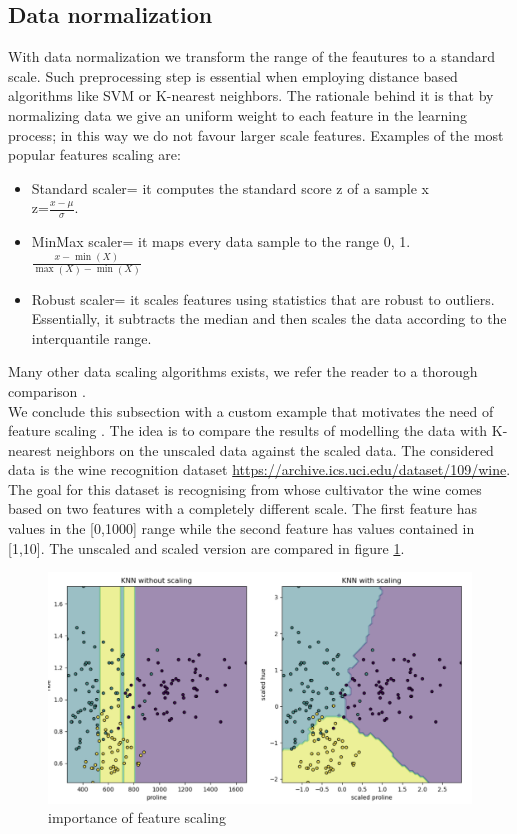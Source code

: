 \subsection{Data normalization}\label{appendix:normalization}
With data normalization we transform the range of the feautures to a standard scale.
Such preprocessing step is essential when employing distance based algorithms like SVM or K-nearest neighbors. The rationale behind it is that by normalizing data we give an uniform weight to each feature in the learning process; in this way we do not favour larger scale features.
Examples of the most popular features scaling are:
\begin{itemize}
    \item Standard scaler= it computes the standard score z of a sample x
    \\
    z=$\frac{x-\mu}{\sigma}$.
    \item MinMax scaler= it maps every data sample to the range 0, 1.
    \\
    $\frac{x-\min(X)}{\max(X)-\min(X)}$
    \item Robust scaler= it scales features using statistics that are robust to outliers.
    Essentially, it subtracts the median and then scales the data according to the interquantile range.
\end{itemize}
Many other data scaling algorithms exists, we refer the reader to a thorough comparison .
\\
We conclude this subsection with a custom example that motivates the need of feature scaling . The idea is to compare the results of modelling the data with K-nearest neighbors on the unscaled data against the scaled data. The considered data is the wine recognition dataset \href{https://archive.ics.uci.edu/dataset/109/wine}{https://archive.ics.uci.edu/dataset/109/wine}. The goal for this dataset is recognising from whose cultivator the wine comes based on two features with a completely different scale. The first feature has values in the [0,1000] range while the second feature has values contained in [1,10].
The unscaled and scaled version are compared in figure \ref{fig:feature_scaler_example}.
\begin{figure}[!h]
    \includegraphics[width=\textwidth]{images/feature_scaler_example.png}
    \caption{importance of feature scaling}
    \label{fig:feature_scaler_example}
\end{figure}
